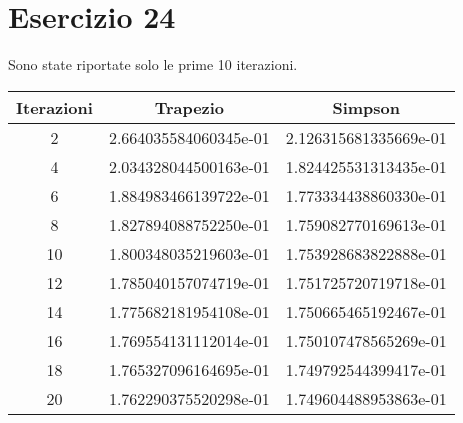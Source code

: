 \section{Esercizio 24}
Sono state riportate solo le prime 10 iterazioni.

\begin{table}[ht]
	\centering
	\small
	\begin{tabular}{| c | c | c|}
	\hline
	Iterazioni & Trapezio & Simpson\\
	\hline
	2 & 2.664035584060345e-01&2.126315681335669e-01\\
	\hline
	4&2.034328044500163e-01&1.824425531313435e-01\\
	\hline
	6 &1.884983466139722e-01&1.773334438860330e-01\\
	\hline
	8&1.827894088752250e-01&1.759082770169613e-01\\
	\hline
	10&1.800348035219603e-01&1.753928683822888e-01 \\
	\hline
	12&1.785040157074719e-01&1.751725720719718e-01\\
	\hline
	14&1.775682181954108e-01&1.750665465192467e-01\\
	\hline
	16&1.769554131112014e-01&1.750107478565269e-01\\
	\hline
	18&1.765327096164695e-01&1.749792544399417e-01\\
	\hline
	20&1.762290375520298e-01&1.749604488953863e-01\\
	\hline
	\end{tabular}
\end{table}



